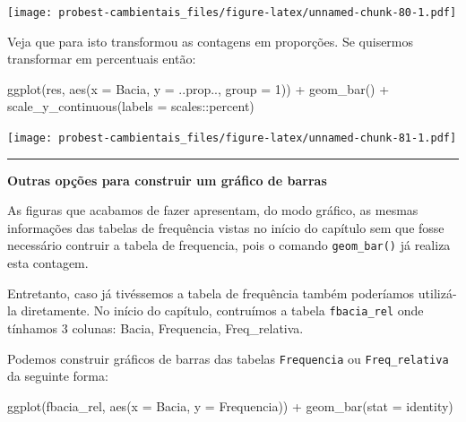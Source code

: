 \documentclass[
]{book}
\newenvironment{Shaded}{\begin{snugshade}}{\end{snugshade}}
\newcommand{\AttributeTok}[1]{\textcolor[rgb]{0.77,0.63,0.00}{#1}}
\newcommand{\DecValTok}[1]{\textcolor[rgb]{0.00,0.00,0.81}{#1}}
\newcommand{\FunctionTok}[1]{\textcolor[rgb]{0.00,0.00,0.00}{#1}}
\newcommand{\NormalTok}[1]{#1}
\newcommand{\SpecialCharTok}[1]{\textcolor[rgb]{0.00,0.00,0.00}{#1}}
\newcommand{\StringTok}[1]{\textcolor[rgb]{0.31,0.60,0.02}{#1}}
\begin{document}
\texttt{[image: probest-cambientais\_files/figure-latex/unnamed-chunk-80-1.pdf]}

Veja que para isto transformou as contagens em proporções. Se quisermos transformar em percentuais então:

\begin{Shaded}
\begin{Highlighting}[]
\FunctionTok{ggplot}\NormalTok{(res, }\FunctionTok{aes}\NormalTok{(}\AttributeTok{x =}\NormalTok{ Bacia, }\AttributeTok{y =}\NormalTok{ ..prop.., }\AttributeTok{group =} \DecValTok{1}\NormalTok{)) }\SpecialCharTok{+}
  \FunctionTok{geom\_bar}\NormalTok{() }\SpecialCharTok{+}
  \FunctionTok{scale\_y\_continuous}\NormalTok{(}\AttributeTok{labels =}\NormalTok{ scales}\SpecialCharTok{::}\NormalTok{percent)}
\end{Highlighting}
\end{Shaded}

\texttt{[image: probest-cambientais\_files/figure-latex/unnamed-chunk-81-1.pdf]}

\begin{center}\rule{0.5\linewidth}{0.5pt}\end{center}

\textbf{Outras opções para construir um gráfico de barras}

As figuras que acabamos de fazer apresentam, do modo gráfico, as mesmas informações das tabelas de frequência vistas no início do capítulo sem que fosse necessário contruir a tabela de frequencia, pois o comando \texttt{geom\_bar()} já realiza esta contagem.

Entretanto, caso já tivéssemos a tabela de frequência também poderíamos utilizá-la diretamente. No início do capítulo, contruímos a tabela \texttt{fbacia\_rel} onde tínhamos 3 colunas: Bacia, Frequencia, Freq\_relativa.

Podemos construir gráficos de barras das tabelas \texttt{Frequencia} ou \texttt{Freq\_relativa} da seguinte forma:

\begin{Shaded}
\begin{Highlighting}[]
\FunctionTok{ggplot}\NormalTok{(fbacia\_rel, }\FunctionTok{aes}\NormalTok{(}\AttributeTok{x =}\NormalTok{ Bacia, }\AttributeTok{y =}\NormalTok{ Frequencia)) }\SpecialCharTok{+}
  \FunctionTok{geom\_bar}\NormalTok{(}\AttributeTok{stat =} \StringTok{\textquotesingle{}identity\textquotesingle{}}\NormalTok{)}
\end{Highlighting}
\end{Shaded}
\end{document}
